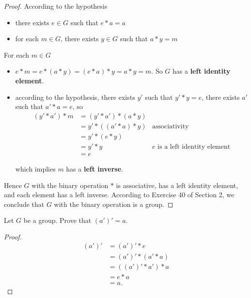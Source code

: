 \begin{proof}
    According to the hypothesis
    \begin{itemize}
        \item there exists $e\in G$ such that $e * a = a$
        \item for each $m\in G$, there exists $y\in G$ such that $a * y = m$
    \end{itemize}

    For each $m\in G$
    \begin{itemize}
        \item $e * m = e * (a * y) = (e * a) * y = a * y = m$. So $G$ has a \textbf{left identity element}.
        \item according to the hypothesis, there exists $y'$ such that $y' * y = e$, there exists $a'$ such that $a' * a = e$, so
              \begin{align*}
                  (y' * a') * m & = (y' * a') * (a * y)                                         \\
                                & = y' * ((a' * a) * y) & \text{associativity}                  \\
                                & = y' * (e * y)                                                \\
                                & = y' * y              & \text{$e$ is a left identity element} \\
                                & = e
              \end{align*}

              which implies $m$ has a \textbf{left inverse}.
    \end{itemize}

    Hence $G$ with the binary operation $*$ is associative, has a left identity element, and each element has a left inverse. According to Exercise 40 of Section 2, we conclude that $G$ with the binary operation is a group.
\end{proof}

\newpage
\begin{exercise}
    Let $G$ be a group. Prove that $(a')' = a$.
\end{exercise}

\begin{proof}
    \begin{align*}
        (a')' & = (a')' * e        \\
              & = (a')' * (a' * a) \\
              & = ((a')' * a') * a \\
              & = e * a            \\
              & = a.
    \end{align*}
\end{proof}

